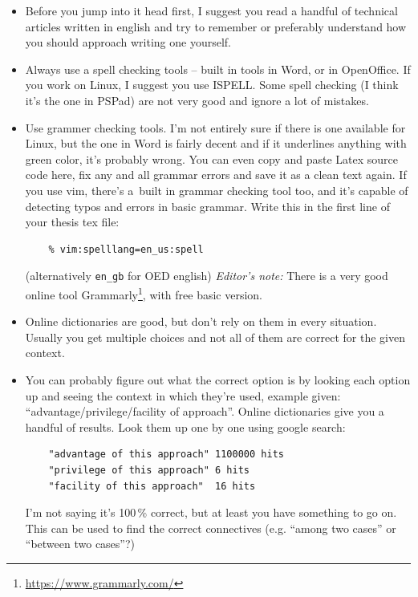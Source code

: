 \begin{itemize}
  \item{Before you jump into it head first, I suggest you read a handful of technical articles written in english and try to remember or preferably understand how you should approach writing one yourself.}
  \item{Always use a spell checking tools -- built in tools in Word, or in OpenOffice. If you work on Linux, I suggest you use ISPELL. Some spell checking (I think it's the one in PSPad) are not very good and ignore a lot of mistakes.}
  \item{Use grammer checking tools. I'm not entirely sure if there is one available for Linux, but the one in Word is fairly decent and if it underlines anything with green color, it's probably wrong. You can even copy and paste Latex source code here, fix any and all grammar errors and save it as a clean text again. If you use vim, there's a~built in grammar checking tool too, and it's capable of detecting typos and errors in basic grammar. Write this in the first line of your thesis tex file:
  \begin{verbatim}
    % vim:spelllang=en_us:spell
  \end{verbatim}
  (alternatively \texttt{en\_gb} for OED english) \textit{Editor's note:} There is a very good online tool Grammarly\footnote{\url{https://www.grammarly.com/}}, with free basic version.
  }
  \item{Online dictionaries are good, but don't rely on them in every situation. Usually you get multiple choices and not all of them are correct for the given context.}
  \item{\begin{samepage}You can probably figure out what the correct option is by looking each option up and seeing the context in which they're used, example given: ``advantage/privilege/facility of approach''. Online dictionaries give you a handful of results. Look them up one by one using google search:
  \begin{verbatim}
    "advantage of this approach" 1100000 hits
    "privilege of this approach" 6 hits
    "facility of this approach"  16 hits
  \end{verbatim}
  I'm not saying it's 100\,\% correct, but at least you have something to go on. This can be used to find the correct connectives (e.g. ``among two cases'' or ``between two cases''?)\end{samepage}}
\end{itemize}
       
